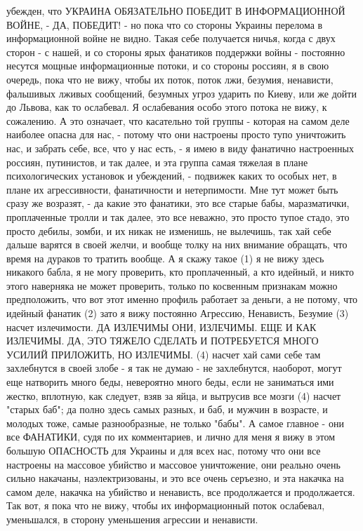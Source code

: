 убежден, что УКРАИНА ОБЯЗАТЕЛЬНО ПОБЕДИТ В ИНФОРМАЦИОННОЙ ВОЙНЕ, - ДА, ПОБЕДИТ!
- но пока что со стороны Украины перелома в информационной войне не видно.
Такая себе получается ничья, когда с двух сторон - с нашей, и со стороны ярых
фанатиков поддержки войны - постоянно несутся мощные информационные потоки, и
со стороны россиян, я в свою очередь, пока что не вижу, чтобы их поток, поток
лжи, безумия, ненависти, фальшивых лживых сообщений, безумных угроз ударить по
Киеву, или же дойти до Львова, как то ослабевал. Я ослабевания особо этого
потока не вижу, к сожалению.  А это означает, что касательно той группы -
которая на самом деле наиболее опасна для нас, - потому что они настроены
просто тупо уничтожить нас, и забрать себе, все, что у нас есть, - я имею в
виду фанатично настроенных россиян, путинистов, и так далее, и эта группа самая
тяжелая в плане психологических установок и убеждений, - подвижек каких то
особых нет, в плане их агрессивности, фанатичности и нетерпимости. Мне тут
может быть сразу же возразят, - да какие это фанатики, это все старые бабы,
маразматички, проплаченные тролли и так далее, это все неважно, это просто
тупое стадо, это просто дебилы, зомби, и их никак не изменишь, не вылечишь, так
хай себе дальше варятся в своей желчи, и вообще толку на них внимание обращать,
что время на дураков то тратить вообще.  А я скажу такое (1) я не вижу здесь
никакого бабла, я не могу проверить, кто проплаченный, а кто идейный, и никто
этого наверняка не может проверить, только по косвенным признакам можно
предположить, что вот этот именно профиль работает за деньги, а не потому, что
идейный фанатик (2) зато я вижу постоянно Агрессию, Ненависть, Безумие (3)
насчет излечимости. ДА ИЗЛЕЧИМЫ ОНИ, ИЗЛЕЧИМЫ. ЕЩЕ И КАК ИЗЛЕЧИМЫ. ДА, ЭТО
ТЯЖЕЛО СДЕЛАТЬ И ПОТРЕБУЕТСЯ МНОГО УСИЛИЙ ПРИЛОЖИТЬ, НО ИЗЛЕЧИМЫ. (4) насчет
хай сами себе там захлебнутся в своей злобе - я так не думаю - не захлебнутся,
наоборот, могут еще натворить много беды, невероятно много беды, если не
заниматься ими жестко, вплотную, как следует, взяв за яйца, и вытрусив все
мозги (4) насчет "старых баб"; да полно здесь самых разных, и баб, и мужчин в
возрасте, и молодых тоже, самые разнообразные, не только "бабы". А самое
главное - они все ФАНАТИКИ, судя по их комментариев, и лично для меня я вижу в
этом большую ОПАСНОСТЬ для Украины и для всех нас, потому что они все настроены
на массовое убийство и массовое уничтожение, они реально очень сильно накачаны,
наэлектризованы, и это все очень серъезно, и эта накачка на самом деле, накачка
на убийство и ненависть, все продолжается и продолжается. Так вот, я пока что
не вижу, чтобы их информационный поток ослабевал, уменьшался, в сторону
уменьшения агрессии и ненависти.

